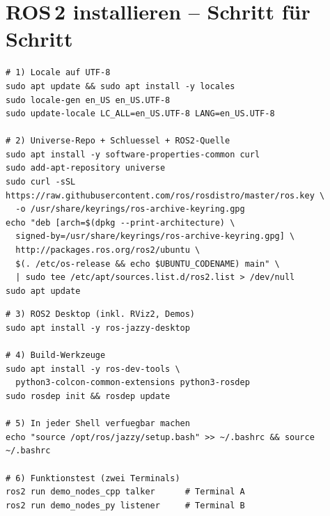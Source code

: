 
\chapter{ROS\,2 installieren -- Schritt für Schritt}
\label{ch:installation}

\begin{lstlisting}[style=bash,caption={Locale + ROS\,2-Apt-Quelle (Ubuntu 24.04)}]
# 1) Locale auf UTF-8
sudo apt update && sudo apt install -y locales
sudo locale-gen en_US en_US.UTF-8
sudo update-locale LC_ALL=en_US.UTF-8 LANG=en_US.UTF-8

# 2) Universe-Repo + Schluessel + ROS2-Quelle
sudo apt install -y software-properties-common curl
sudo add-apt-repository universe
sudo curl -sSL https://raw.githubusercontent.com/ros/rosdistro/master/ros.key \
  -o /usr/share/keyrings/ros-archive-keyring.gpg
echo "deb [arch=$(dpkg --print-architecture) \
  signed-by=/usr/share/keyrings/ros-archive-keyring.gpg] \
  http://packages.ros.org/ros2/ubuntu \
  $(. /etc/os-release && echo $UBUNTU_CODENAME) main" \
  | sudo tee /etc/apt/sources.list.d/ros2.list > /dev/null
sudo apt update
\end{lstlisting}

\begin{lstlisting}[style=bash,caption={ROS\,2 Jazzy + Entwicklungswerkzeuge}]
# 3) ROS2 Desktop (inkl. RViz2, Demos)
sudo apt install -y ros-jazzy-desktop

# 4) Build-Werkzeuge
sudo apt install -y ros-dev-tools \
  python3-colcon-common-extensions python3-rosdep
sudo rosdep init && rosdep update

# 5) In jeder Shell verfuegbar machen
echo "source /opt/ros/jazzy/setup.bash" >> ~/.bashrc && source ~/.bashrc

# 6) Funktionstest (zwei Terminals)
ros2 run demo_nodes_cpp talker      # Terminal A
ros2 run demo_nodes_py listener     # Terminal B
\end{lstlisting}

